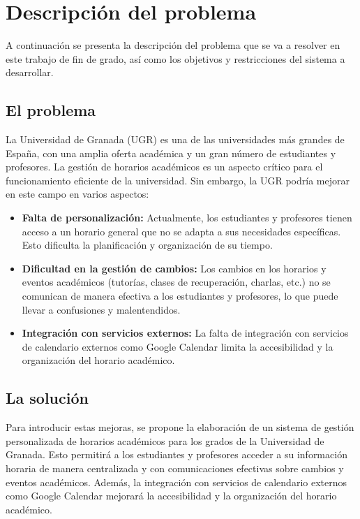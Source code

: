 \chapter{Descripción del problema}\label{cap:descripcion}

A continuación se presenta la descripción del problema que se va a resolver en este trabajo de fin de grado, así como los objetivos y restricciones del sistema a desarrollar.

\section{El problema}

La Universidad de Granada (UGR) es una de las universidades más grandes de España, con una amplia oferta académica y un gran número de estudiantes y profesores. La gestión de horarios académicos es un aspecto crítico para el funcionamiento eficiente de la universidad. Sin embargo, la UGR podría mejorar en este campo en varios aspectos:

\begin{itemize}
    \item \textbf{Falta de personalización:} Actualmente, los estudiantes y profesores tienen acceso a un horario general que no se adapta a sus necesidades específicas. Esto dificulta la planificación y organización de su tiempo.
    \item \textbf{Dificultad en la gestión de cambios:} Los cambios en los horarios y eventos académicos (tutorías, clases de recuperación, charlas, etc.) no se comunican de manera efectiva a los estudiantes y profesores, lo que puede llevar a confusiones y malentendidos.
    \item \textbf{Integración con servicios externos:} La falta de integración con servicios de calendario externos como Google Calendar limita la accesibilidad y la organización del horario académico.
\end{itemize}

\section{La solución}

Para introducir estas mejoras, se propone la elaboración de un sistema de gestión personalizada de horarios académicos para los grados de la Universidad de Granada. 
Esto permitirá a los estudiantes y profesores acceder a su información horaria de manera centralizada y con comunicaciones efectivas sobre cambios y eventos académicos. Además, la integración con servicios de calendario externos como Google Calendar mejorará la accesibilidad y la organización del horario académico.

